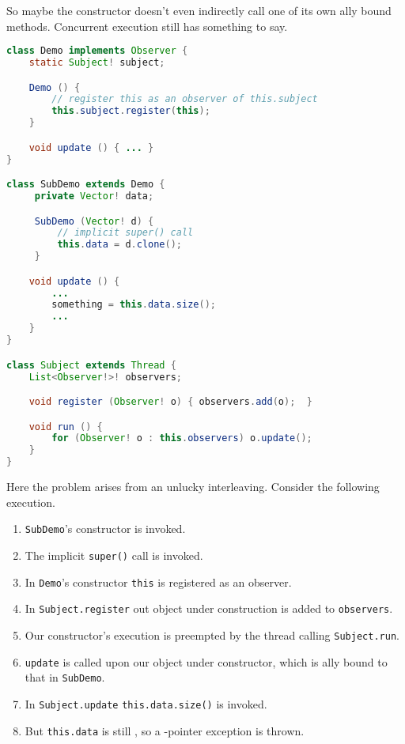 \documentclass{article}
\begin{document}
\begin{example}
  So maybe the constructor doesn't even indirectly call one of its own \dynamic{}ally bound methods.
  Concurrent execution still has something to say.
\begin{lstlisting}[escapechar=|, language=Java]
class Demo implements Observer {
    static Subject! subject;

    Demo () {
        // register this as an observer of this.subject
        this.subject.register(this);
    }

    void update () { ... }
}

class SubDemo extends Demo {
     private Vector! data;

     SubDemo (Vector! d) {
         // implicit super() call
         this.data = d.clone();
     }

    void update () {
        ...
        something = this.data.size();
        ...
    }
}

class Subject extends Thread {
    List<Observer!>! observers;

    void register (Observer! o) { observers.add(o);  }

    void run () {
        for (Observer! o : this.observers) o.update();
    }
}
\end{lstlisting}
  Here the problem arises from an unlucky interleaving.
  Consider the following execution.
  \begin{enumerate}
  \item \texttt{SubDemo}'s constructor is invoked.
  \item The implicit \texttt{super()} call is invoked.
  \item In \texttt{Demo}'s constructor \texttt{this} is registered as an observer.
  \item In \texttt{Subject.register} out object under construction is added to \texttt{observers}.
  \item Our constructor's execution is preempted by the thread calling \texttt{Subject.run}.
  \item \texttt{update} is called upon our object under constructor, which is \dynamic{}ally bound to that in \texttt{SubDemo}.
  \item In \texttt{Subject.update} \texttt{this.data.size()} is invoked.
  \item But \texttt{this.data} is still \cringe{}, so a \cringe{}-pointer exception is thrown.
  \end{enumerate}
\end{example}
\end{document}
